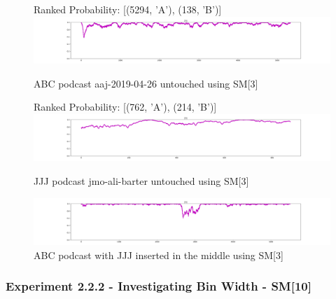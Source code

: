 \begin{figure}[h]
\begin{center}

Ranked Probability: [(5294, 'A'), (138, 'B')]
\includegraphics[scale=0.2]{src/main-matter/results/experiment-age/entropy/audio_aug/[3]/abc}
\caption{ABC podcast aaj-2019-04-26 untouched using SM[3]}

Ranked Probability: [(762, 'A'), (214, 'B')]
\includegraphics[scale=0.2]{src/main-matter/results/experiment-age/entropy/audio_aug/[3]/jjj}
\caption{JJJ podcast jmo-ali-barter untouched using SM[3]}


\includegraphics[scale=0.2]{src/main-matter/results/experiment-age/entropy/audio_aug/[3]/abc-middle-jjj}
\caption{ABC podcast with JJJ inserted in the middle using SM[3]}
%
%


\label{default}
\end{center}
\end{figure}




\clearpage

\subsubsection{Experiment 2.2.2 - Investigating Bin Width - SM[10]}

